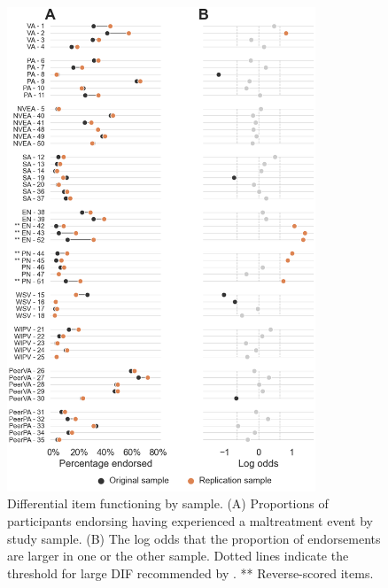 \documentclass[letterpaper,man,natbib,noextraspace,floatsintext,longtable]{apa6}
\begin{document}
\begin{figure}[H]
    \centering
    \includegraphics[width=0.82\textwidth,center]{figures/figS01.png}
    \caption{\normalfont Differential item functioning by sample. (A) Proportions of participants endorsing having experienced a maltreatment event by study sample. (B) The log odds that the proportion of endorsements are larger in one or the other sample. Dotted lines indicate the threshold for large DIF recommended by \cite{hidalgo2014binary}. ** Reverse-scored items.}
    \label{fig:dif_study}
\end{figure}
\end{document}
